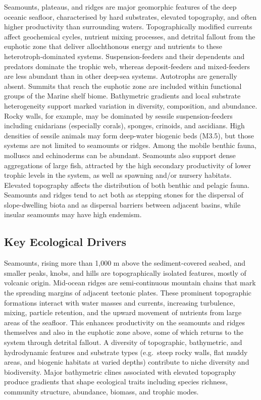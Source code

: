 \documentclass[
  letterpaper,
  DIV=11,
  numbers=noendperiod]{scrartcl}
\begin{document}
Seamounts, plateaus, and ridges are major geomorphic features of the
deep oceanic seafloor, characterised by hard substrates, elevated
topography, and often higher productivity than surrounding waters.
Topographically modified currents affect geochemical cycles, nutrient
mixing processes, and detrital fallout from the euphotic zone that
deliver allochthonous energy and nutrients to these
heterotroph-dominated systems. Suspension-feeders and their dependents
and predators dominate the trophic web, whereas deposit-feeders and
mixed-feeders are less abundant than in other deep-sea systems.
Autotrophs are generally absent. Summits that reach the euphotic zone
are included within functional groups of the Marine shelf biome.
Bathymetric gradients and local substrate heterogeneity support marked
variation in diversity, composition, and abundance. Rocky walls, for
example, may be dominated by sessile suspension-feeders including
cnidarians (especially corals), sponges, crinoids, and ascidians. High
densities of sessile animals may form deep-water biogenic beds (M3.5),
but those systems are not limited to seamounts or ridges. Among the
mobile benthic fauna, molluscs and echinoderms can be abundant.
Seamounts also support dense aggregations of large fish, attracted by
the high secondary productivity of lower trophic levels in the system,
as well as spawning and/or nursery habitats. Elevated topography affects
the distribution of both benthic and pelagic fauna. Seamounts and ridges
tend to act both as stepping stones for the dispersal of slope-dwelling
biota and as dispersal barriers between adjacent basins, while insular
seamounts may have high endemism.

\subsection{Key Ecological Drivers}\label{key-ecological-drivers-43}

Seamounts, rising more than 1,000 m above the sediment-covered seabed,
and smaller peaks, knobs, and hills are topographically isolated
features, mostly of volcanic origin. Mid-ocean ridges are
semi-continuous mountain chains that mark the spreading margins of
adjacent tectonic plates. These prominent topographic formations
interact with water masses and currents, increasing turbulence, mixing,
particle retention, and the upward movement of nutrients from large
areas of the seafloor. This enhances productivity on the seamounts and
ridges themselves and also in the euphotic zone above, some of which
returns to the system through detrital fallout. A diversity of
topographic, bathymetric, and hydrodynamic features and substrate types
(e.g.~steep rocky walls, flat muddy areas, and biogenic habitats at
varied depths) contribute to niche diversity and biodiversity. Major
bathymetric clines associated with elevated topography produce gradients
that shape ecological traits including species richness, community
structure, abundance, biomass, and trophic modes.
\end{document}
